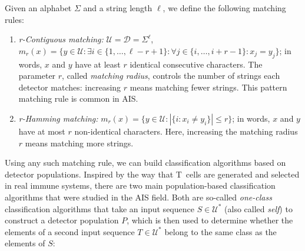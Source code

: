 \documentclass{llncs}
\begin{document}
\begin{definition}
Given an alphabet $\Sigma$ and a string length $\ell$, we define the following matching rules:
\begin{enumerate}
 \item \emph{r-Contiguous matching:}  $\mathcal{U}=\mathcal{D}=\Sigma^\ell$, $m_r(x)=\{y \in \mathcal{U} : \exists i \in \{1,\ldots,\ell-r+1\} : \forall j \in \{i,\ldots,i+r-1\} : x_j = y_j \}$; in words, $x$ and $y$ have at least $r$ identical
consecutive characters. 
 The parameter $r$, called \emph{matching radius}, controls the number of strings each 
 detector matches: increasing $r$ means matching fewer strings. This pattern matching 
 rule is common in AIS.
\item \emph{r-Hamming matching:} $m_r(x)=\{y \in \mathcal{U} : |\{ i : x_i \neq y_i \}| \leq r \}$;
in words, $x$ and $y$ have at most $r$ non-identical characters.
Here, increasing the matching radius $r$ means matching more strings.
\end{enumerate}
\label{definitionmatchingrules} %
\end{definition}

Using any such matching rule, we can build classification algorithms based on detector 
populations. 
Inspired by the way that T~cells are generated and selected in real immune systems,
there are two main population-based classification algorithms that were studied in the AIS field. 
Both are so-called \emph{one-class} classification algorithms that take an input 
sequence $S \in \mathcal{U}^*$ (also called \emph{self}) to construct a detector population $P$, 
which is then used to determine whether the elements of a second input sequence $T \in \mathcal{U}^*$ 
belong to the same class as the elements of $S$:
\end{document}
